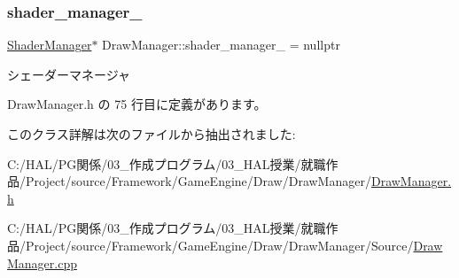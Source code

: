 \subsubsection{\texorpdfstring{shader\+\_\+manager\+\_\+}{shader\_manager\_}}
{\footnotesize\ttfamily \mbox{\hyperlink{class_shader_manager}{Shader\+Manager}}$\ast$ Draw\+Manager\+::shader\+\_\+manager\+\_\+ = nullptr\hspace{0.3cm}{\ttfamily [private]}}



シェーダーマネージャ 



 Draw\+Manager.\+h の 75 行目に定義があります。



このクラス詳解は次のファイルから抽出されました\+:\begin{DoxyCompactItemize}
\item 
C\+:/\+H\+A\+L/\+P\+G関係/03\+\_\+作成プログラム/03\+\_\+\+H\+A\+L授業/就職作品/\+Project/source/\+Framework/\+Game\+Engine/\+Draw/\+Draw\+Manager/\mbox{\hyperlink{_draw_manager_8h}{Draw\+Manager.\+h}}\item 
C\+:/\+H\+A\+L/\+P\+G関係/03\+\_\+作成プログラム/03\+\_\+\+H\+A\+L授業/就職作品/\+Project/source/\+Framework/\+Game\+Engine/\+Draw/\+Draw\+Manager/\+Source/\mbox{\hyperlink{_draw_manager_8cpp}{Draw\+Manager.\+cpp}}\end{DoxyCompactItemize}
